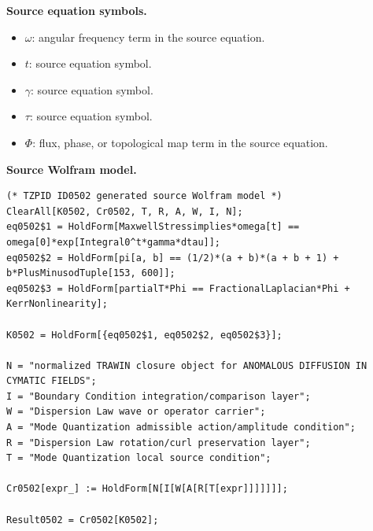 \begin{minipage}[t]{0.49\linewidth}
\begingroup
\small
\raggedright
\textbf{Source equation symbols.}\par
\begin{itemize}[leftmargin=1.35em,itemsep=1pt,topsep=1pt,parsep=0pt]
    \item $\omega$: angular frequency term in the source equation.
    \item $t$: source equation symbol.
    \item $\gamma$: source equation symbol.
    \item $\tau$: source equation symbol.
    \item $\Phi$: flux, phase, or topological map term in the source equation.
\end{itemize}
\endgroup
\end{minipage}\hfill
\begin{minipage}[t]{0.47\linewidth}
\begingroup
\scriptsize
\raggedright
\textbf{Source Wolfram model.}\par
\begin{Verbatim}[fontsize=\tiny,breaklines=true,breakanywhere=true]
(* TZPID ID0502 generated source Wolfram model *)
ClearAll[K0502, Cr0502, T, R, A, W, I, N];
eq0502$1 = HoldForm[MaxwellStressimplies*omega[t] == omega[0]*exp[Integral0^t*gamma*dtau]];
eq0502$2 = HoldForm[pi[a, b] == (1/2)*(a + b)*(a + b + 1) + b*PlusMinusodTuple[153, 600]];
eq0502$3 = HoldForm[partialT*Phi == FractionalLaplacian*Phi + KerrNonlinearity];

K0502 = HoldForm[{eq0502$1, eq0502$2, eq0502$3}];

N = "normalized TRAWIN closure object for ANOMALOUS DIFFUSION IN CYMATIC FIELDS";
I = "Boundary Condition integration/comparison layer";
W = "Dispersion Law wave or operator carrier";
A = "Mode Quantization admissible action/amplitude condition";
R = "Dispersion Law rotation/curl preservation layer";
T = "Mode Quantization local source condition";

Cr0502[expr_] := HoldForm[N[I[W[A[R[T[expr]]]]]]];

Result0502 = Cr0502[K0502];
\end{Verbatim}
\endgroup
\end{minipage}

